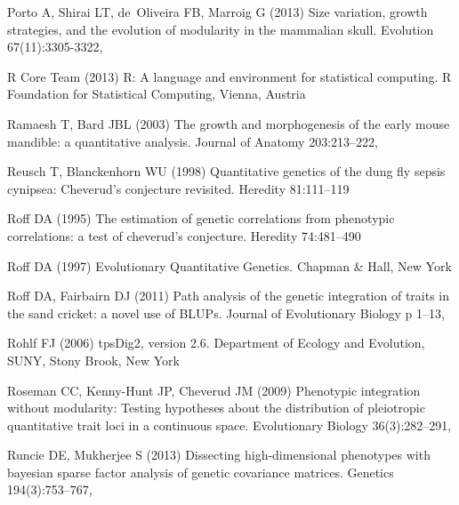 \documentclass [twocolumn, natbib, nospthms, 10pt] {svjour3}
\begin{document}
\begin{thebibliography}{77}
Porto A, Shirai LT, de~Oliveira FB, Marroig G (2013) Size variation, growth
  strategies, and the evolution of modularity in the mammalian skull. 
  Evolution 67(11):3305-3322, 

R Core Team (2013) R: A language and environment for statistical computing.
  R Foundation for Statistical Computing, Vienna, Austria

Ramaesh T, Bard JBL (2003) The growth and morphogenesis of the early mouse
  mandible: a quantitative analysis. Journal of Anatomy 203:213–222,

Reusch T, Blanckenhorn WU (1998) Quantitative genetics of the dung fly sepsis
  cynipsea: Cheverud’s conjecture revisited. Heredity 81:111–119

Roff DA (1995) The estimation of genetic correlations from phenotypic
  correlations: a test of cheverud’s conjecture. Heredity 74:481–490

Roff DA (1997) Evolutionary Quantitative Genetics. Chapman \& Hall, New York

Roff DA, Fairbairn DJ (2011) Path analysis of the genetic integration of traits
  in the sand cricket: a novel use of {BLUPs}. Journal of Evolutionary Biology
  p 1–13, 

Rohlf FJ (2006) {tpsDig}2, version 2.6. Department of Ecology and Evolution,
  {SUNY}, Stony Brook, New York

Roseman CC, Kenny-Hunt JP, Cheverud JM (2009) Phenotypic integration without
  modularity: Testing hypotheses about the distribution of pleiotropic
  quantitative trait loci in a continuous space. Evolutionary Biology
  36(3):282–291, 

Runcie DE, Mukherjee S (2013) Dissecting high-dimensional phenotypes with
  bayesian sparse factor analysis of genetic covariance matrices. Genetics
  194(3):753--767, 


\end{thebibliography}
\end{document}
